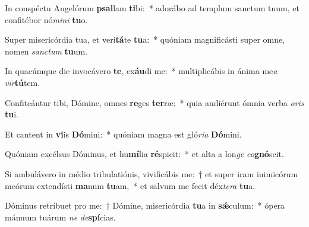 \item In conspéctu Angelórum \textbf{psal}lam \textbf{ti}bi:~* adorábo ad templum sanctum tuum, et confitébor nó\textit{mi}\textit{ni} \textbf{tu}o.
\item Super misericórdia tua, et veri\textbf{tá}te \textbf{tu}a:~* quóniam magnificásti super omne, nomen \textit{sanc}\textit{tum} \textbf{tu}um.
\item In quacúmque die invocávero \textbf{te}, ex\textbf{áu}di me:~* multiplicábis in ánima me\textit{a} \textit{vir}\textbf{tú}tem.
\item Confiteántur tibi, Dómine, omnes \textbf{re}ges \textbf{ter}ræ:~* quia audiérunt ómnia verba \textit{o}\textit{ris} \textbf{tu}i.
\item Et cantent in \textbf{vi}is \textbf{Dó}mini:~* quóniam magna est gló\textit{ri}\textit{a} \textbf{Dó}mini.
\item Quóniam excélsus Dóminus, et hu\textbf{mí}lia \textbf{ré}spicit:~* et alta a lon\textit{ge} \textit{co}\textbf{gnó}scit.
\item Si ambulávero in médio tribulatiónis, vivificábis me:~† et super iram inimicórum meórum extendísti \textbf{ma}num \textbf{tu}am,~* et salvum me fecit déx\textit{te}\textit{ra} \textbf{tu}a.
\item Dóminus retríbuet pro me:~† Dómine, misericórdia \textbf{tu}a in \textbf{sǽ}culum:~* ópera mánuum tuárum \textit{ne} \textit{de}\textbf{spí}cias.
